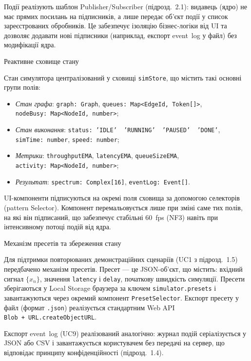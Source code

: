 Події реалізують шаблон Publisher/Subscriber (підрозд.~2.1): видавець
(ядро) не має прямих посилань на підписників, а лише передає об'єкт
події у список зареєстрованих обробників. Це забезпечує ізоляцію
бізнес-логіки від UI та дозволяє додавати нові підписники (наприклад,
експорт event~log у файл) без модифікації ядра.

Реактивне сховище стану

Стан симулятора централізований у сховищі \texttt{simStore}, що містить
такі основні групи полів:

\begin{itemize}
\item
  \emph{Стан графа}: \texttt{graph:\ Graph},
  \texttt{queues:\ Map\textless{}EdgeId,\ Token{[}{]}\textgreater{}},
  \texttt{nodeBusy:\ Map\textless{}NodeId,\ number\textgreater{}};
\item
  \emph{Стан виконання}:
  \texttt{status:\ ’IDLE’\ \textbar{}\ ’RUNNING’\ \textbar{}\ ’PAUSED’\ \textbar{}\ ’DONE’},
  \texttt{simTime:\ number}, \texttt{speed:\ number};
\item
  \emph{Метрики}: \texttt{throughputEMA}, \texttt{latencyEMA},
  \texttt{queueSizeEMA},
  \texttt{activity:\ Map\textless{}NodeId,\ number\textgreater{}};
\item
  \emph{Результат}: \texttt{spectrum:\ Complex{[}16{]}},
  \texttt{eventLog:\ Event{[}{]}}.
\end{itemize}

UI-компоненти підписуються на окремі поля сховища за допомогою
селекторів (pattern Selector). Компонент перемальовується лише при зміні
саме тих полів, на які він підписаний, що забезпечує стабільні 60~fps
(NF3) навіть при інтенсивному потоці подій від ядра.

Механізм пресетів та збереження стану

Для підтримки повторюваних демонстраційних сценаріїв (UC1 з
підрозд.~1.5) передбачено механізм пресетів. Пресет --- це JSON-об'єкт,
що містить: вхідний сигнал \(\{ x_{n}\}\), значення \texttt{latency} і
\texttt{delay}, початкову швидкість симуляції. Пресети зберігаються у
Local Storage браузера за ключем \texttt{simulator.presets} і
завантажуються через окремий компонент \texttt{PresetSelector}. Експорт
пресету у файл (формат \texttt{.json}) реалізується стандартним Web API
\texttt{Blob\ +\ URL.createObjectURL}.

Експорт event~log (UC9) реалізований аналогічно: журнал подій
серіалізується у JSON або CSV і завантажується користувачем без передачі
на сервер, що відповідає принципу конфіденційності (підрозд.~1.4).

